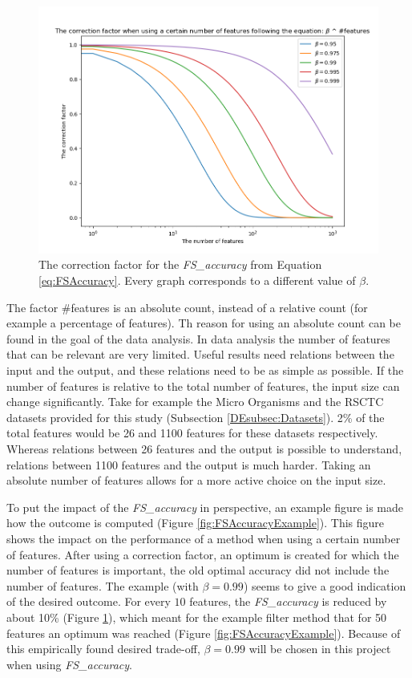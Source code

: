 \documentclass[10pt,a4paper]{report}
\begin{document}
	\begin{figure}[H]
		\includegraphics[width=1\textwidth]{FS_accuracy_alpha.png}
		\caption{The correction factor for the \textit{FS\_accuracy} from Equation \ref{eq:FSAccuracy}. Every graph corresponds to a different value of $\beta$.}
		\label{fig:FSAccuracyPlot}
	\end{figure}
	
	The factor \mbox{\#features} is an absolute count, instead of a relative count (for example a percentage of features). Th reason for using an absolute count can be found in the goal of the data analysis. In data analysis the number of features that can be relevant are very limited. Useful results need relations between the input and the output, and these relations need to be as simple as possible. If the number of features is relative to the total number of features, the input size can change significantly. Take for example the Micro Organisms and the RSCTC datasets provided for this study (Subsection \ref{DEsubsec:Datasets}). 2\% of the total features would be 26 and 1100 features for these datasets respectively. Whereas relations between 26 features and the output is possible to understand, relations between 1100 features and the output is much harder. Taking an absolute number of features allows for a more active choice on the input size.
	
	To put the impact of the \textit{FS\_accuracy} in perspective, an example figure is made how the outcome is computed (Figure \ref{fig:FSAccuracyExample}). This figure shows the impact on the performance of a method when using a certain number of features. After using a correction factor, an optimum is created for which the number of features is important, the old optimal accuracy did not include the number of features. The example (with $\beta = 0.99$) seems to give a good indication of the desired outcome. For every $10$ features, the \textit{FS\_accuracy} is reduced by about 10\% (Figure \ref{fig:FSAccuracyPlot}), which meant for the example filter method that for 50 features an optimum was reached (Figure \ref{fig:FSAccuracyExample}). Because of this empirically found desired trade-off, $\beta = 0.99$ will be chosen in this project when using \textit{FS\_accuracy}. 
	
\end{document}
